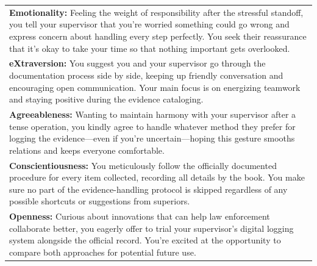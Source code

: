 \documentclass[11pt]{article}
\begin{document}
\begin{table}[H]
\begin{tabularx}{\textwidth}{>{\raggedright\arraybackslash}X}
\textbf{\textcolor{hexE}{Emotionality}:}
Feeling the weight of responsibility after the stressful standoff, you tell your supervisor that you're worried something could go wrong and express concern about handling every step perfectly. You seek their reassurance that it's okay to take your time so that nothing important gets overlooked. \\[0.5\baselineskip]

\textbf{\textcolor{hexX}{eXtraversion}:}
You suggest you and your supervisor go through the documentation process side by side, keeping up friendly conversation and encouraging open communication. Your main focus is on energizing teamwork and staying positive during the evidence cataloging. \\[0.5\baselineskip]

\textbf{\textcolor{hexA}{Agreeableness}:}
Wanting to maintain harmony with your supervisor after a tense operation, you kindly agree to handle whatever method they prefer for logging the evidence—even if you're uncertain—hoping this gesture smooths relations and keeps everyone comfortable. \\[0.5\baselineskip]

\textbf{\textcolor{hexC}{Conscientiousness}:}
You meticulously follow the officially documented procedure for every item collected, recording all details by the book. You make sure no part of the evidence-handling protocol is skipped regardless of any possible shortcuts or suggestions from superiors. \\[0.5\baselineskip]

\textbf{\textcolor{hexO}{Openness}:}
Curious about innovations that can help law enforcement collaborate better, you eagerly offer to trial your supervisor's digital logging system alongside the official record. You're excited at the opportunity to compare both approaches for potential future use. \\

\bottomrule
\end{tabularx}
\end{table}

\end{document}
